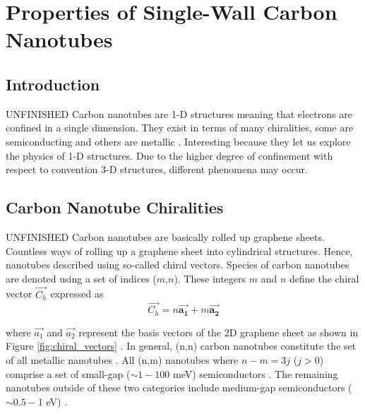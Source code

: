 \chapter{Properties of Single-Wall Carbon Nanotubes}

\section{Introduction}
{\color{red}UNFINISHED} Carbon nanotubes are 1-D structures meaning that electrons are confined in a single dimension. They exist in terms of many chiralities, some are semiconducting and others are metallic \cite{soavi2016ultrafast}. Interesting because they let us explore the physics of 1-D structures. Due to the higher degree of confinement with respect to convention 3-D structures, different phenomena may occur.



\section{Carbon Nanotube Chiralities}

{\color{red}UNFINISHED} Carbon nanotubes are basically rolled up graphene sheets. Countless ways of rolling up a graphene sheet into cylindrical structures. Hence, nanotubes described using so-called chiral vectors. Species of carbon nanotubes are denoted using a set of indices ($m$,$n$). These integers $m$ and $n$ define the chiral vector $\vec{C_h }$ expressed as 
\begin{equation}
	\vec{C_h} = n \bm{\vec{a_1}} + m \bm{\vec{a_2}}
\end{equation}

where $\vec{a_1}$ and $\vec{a_2}$ represent the basis vectors of the 2D graphene sheet as shown in Figure \ref{fig:chiral_vectors} \cite{nanot2012optoelectronic}. In general, (n,n) carbon nanotubes constitute the set of all metallic nanotubes \cite{nanot2012optoelectronic}. All (n,m) nanotubes where $n-m = 3j$ ($j > 0$) comprise a set of small-gap ($\sim1 - 100$ meV) semiconductors \cite{nanot2012optoelectronic}. The remaining nanotubes outside of these two categories include medium-gap semiconductors ($\sim0.5 - 1$ eV) \cite{nanot2012optoelectronic}.

